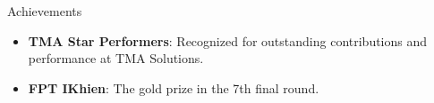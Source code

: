 \documentclass{resume} %
\begin{document}

\begin{rSection}{Achievements}
\begin{itemize}
    \item {\bf TMA Star Performers}: Recognized for outstanding contributions and performance at TMA Solutions.
    \item {\bf FPT IKhien}: The gold prize in the 7th final round.
\end{itemize}
\end{rSection}
\end{document}
